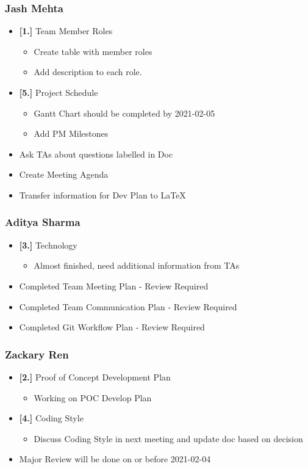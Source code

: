 \documentclass[11pt, oneside]{article}   	%
\begin{document}
\subsubsection*{Jash Mehta}
\begin{itemize}
\item \textbf{[1.]} Team Member Roles
\begin{itemize}
\item Create table with member roles
\item Add description to each role.
\end{itemize}

\item \textbf{[5.]} Project Schedule
\begin{itemize}
\item Gantt Chart should be completed by 2021-02-05
\item Add PM Milestones
\end{itemize}

\item Ask TAs about questions labelled in Doc
\item Create Meeting Agenda
\item Transfer information for Dev Plan to LaTeX
\end{itemize}

\subsubsection*{Aditya Sharma}
\begin{itemize}
\item \textbf{[3.]} Technology
\begin{itemize}
\item Almost finished, need additional information from TAs
\end{itemize}

\item Completed Team Meeting Plan - Review Required
\item Completed Team Communication Plan - Review Required
\item Completed Git Workflow Plan - Review Required
\end{itemize}

\subsubsection*{Zackary Ren}
\begin{itemize}
\item \textbf{[2.]} Proof of Concept Development Plan
\begin{itemize}
\item Working on POC Develop Plan
\end{itemize}

\item \textbf{[4.]} Coding Style
\begin{itemize}
\item Discuss Coding Style in next meeting and update doc based on decision
\end{itemize}

\item Major Review will be done on or before 2021-02-04
\end{itemize}
\end{document}
